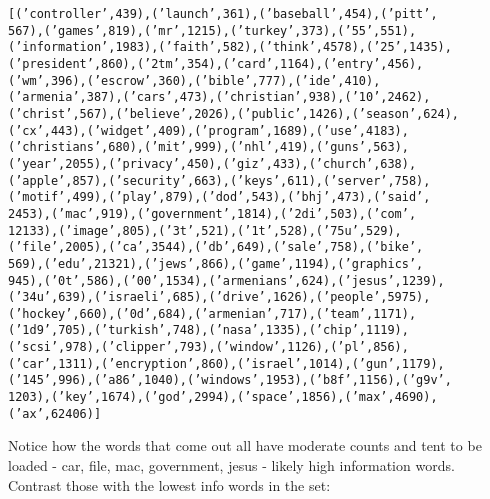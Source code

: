 \documentclass[letterpaper,10pt,english]{/usr/local/lib/python3.4/dist-packages/sphinx/texinputs/sphinxhowto}
\newenvironment{InvisibleVerbatim}
        {\begin{mdframed}[leftmargin=0.1\linewidth,innerleftmargin=3pt,innerrightmargin=3pt, userdefinedwidth=1\linewidth, linewidth=0pt, linecolor=white, usetwoside=false]}
        {\end{mdframed}}
\begin{document}
                \begin{InvisibleVerbatim}
                \vspace{-0.5\baselineskip}
\begin{alltt}[('controller', 439), ('launch', 361), ('baseball', 454), ('pitt',
567), ('games', 819), ('mr', 1215), ('turkey', 373), ('55', 551),
('information', 1983), ('faith', 582), ('think', 4578), ('25', 1435),
('president', 860), ('2tm', 354), ('card', 1164), ('entry', 456),
('wm', 396), ('escrow', 360), ('bible', 777), ('ide', 410),
('armenia', 387), ('cars', 473), ('christian', 938), ('10', 2462),
('christ', 567), ('believe', 2026), ('public', 1426), ('season', 624),
('cx', 443), ('widget', 409), ('program', 1689), ('use', 4183),
('christians', 680), ('mit', 999), ('nhl', 419), ('guns', 563),
('year', 2055), ('privacy', 450), ('giz', 433), ('church', 638),
('apple', 857), ('security', 663), ('keys', 611), ('server', 758),
('motif', 499), ('play', 879), ('dod', 543), ('bhj', 473), ('said',
2453), ('mac', 919), ('government', 1814), ('2di', 503), ('com',
12133), ('image', 805), ('3t', 521), ('1t', 528), ('75u', 529),
('file', 2005), ('ca', 3544), ('db', 649), ('sale', 758), ('bike',
569), ('edu', 21321), ('jews', 866), ('game', 1194), ('graphics',
945), ('0t', 586), ('00', 1534), ('armenians', 624), ('jesus', 1239),
('34u', 639), ('israeli', 685), ('drive', 1626), ('people', 5975),
('hockey', 660), ('0d', 684), ('armenian', 717), ('team', 1171),
('1d9', 705), ('turkish', 748), ('nasa', 1335), ('chip', 1119),
('scsi', 978), ('clipper', 793), ('window', 1126), ('pl', 856),
('car', 1311), ('encryption', 860), ('israel', 1014), ('gun', 1179),
('145', 996), ('a86', 1040), ('windows', 1953), ('b8f', 1156), ('g9v',
1203), ('key', 1674), ('god', 2994), ('space', 1856), ('max', 4690),
('ax', 62406)]
\end{alltt}

            \end{InvisibleVerbatim}
            
        
    
Notice how the words that come out all have moderate counts and tent to
be loaded - car, file, mac, government, jesus - likely high information
words. Contrast those with the lowest info words in the set:

\end{document}
